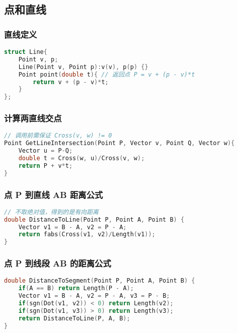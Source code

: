 \subsection{点和直线}

\subsubsection{直线定义}

\begin{lstlisting}[language=C++]
struct Line{
    Point v, p;
    Line(Point v, Point p):v(v), p(p) {}
    Point point(double t){ // 返回点 P = v + (p - v)*t
        return v + (p - v)*t;
    }
};
\end{lstlisting}

\subsubsection{计算两直线交点}

\begin{lstlisting}[language=C++]
// 调用前需保证 Cross(v, w) != 0
Point GetLineIntersection(Point P, Vector v, Point Q, Vector w){
    Vector u = P-Q;
    double t = Cross(w, u)/Cross(v, w);
    return P + v*t;
}
\end{lstlisting}

\subsubsection{点 P 到直线 AB 距离公式}

\begin{lstlisting}[language=C++]
// 不取绝对值，得到的是有向距离
double DistanceToLine(Point P, Point A, Point B) {
    Vector v1 = B - A, v2 = P - A;
    return fabs(Cross(v1, v2)/Length(v1));
}
\end{lstlisting}

\subsubsection{点 P 到线段 AB 的距离公式}

\begin{lstlisting}[language=C++]
double DistanceToSegment(Point P, Point A, Point B) {
    if(A == B) return Length(P - A);
    Vector v1 = B - A, v2 = P - A, v3 = P - B;
    if(sgn(Dot(v1, v2)) < 0) return Length(v2);
    if(sgn(Dot(v1, v3)) > 0) return Length(v3);
    return DistanceToLine(P, A, B);
}
\end{lstlisting}

